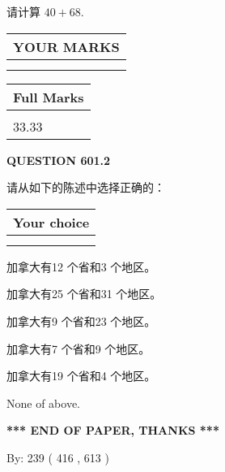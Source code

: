 \documentclass{ctexart}
\begin{document}
  
 
请计算 $ %
40 +  %
68 $.
 

 

 
  
\vspace{0.2in}
  
\noindent\begin{tabular}{|l|}
\hline
 YOUR MARKS  \\
\hline
 \\ 
 \\ 
\hline
\end{tabular}
\hspace{0.05in} \begin{tabular}{|l|}
\hline
 Full Marks  \\
\hline
 \\ 
33.33 \\
\hline
\end{tabular}
{\textbf{\Large{QUESTION
601.2 
}}}
  
  
请从如下的陈述中选择正确的：
  
  
\noindent\hspace{3.0in} \begin{tabular}{|l|}
\hline
Your choice \\
\hline
 \\ 
 \\ 
\hline
\end{tabular}
  
  
 
 
加拿大有12 个省和3 个地区。
 
 
加拿大有25 个省和31 个地区。
 
 
加拿大有9 个省和23 个地区。
 
 
加拿大有7 个省和9 个地区。
 
 
加拿大有19 个省和4 个地区。
 
 
 None of above.
 
 
   
   
 \vspace{0.2in}
 
   
   
   
   
\vspace{1.0in} 
{\textbf{\large{ *** END OF PAPER, THANKS *** }}} 
   
   
\hspace{1.0in} By: 
 239 ( 416 ,  613 )
   
\end{document}
